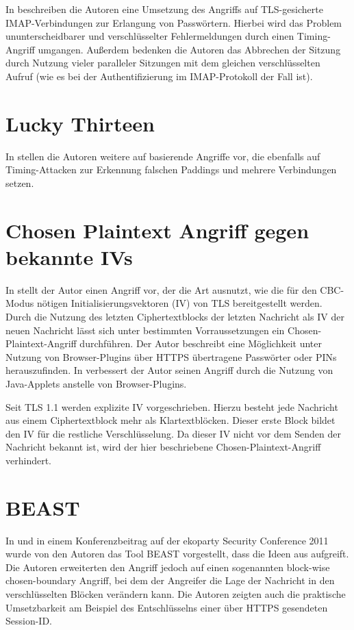 \documentclass[
    12pt,
    headings=small,
    parskip=half,           %
    bibliography=totoc,
    numbers=noenddot,       %
    open=any,               %
   final                   %
    ]{scrreprt}
\begin{document}
In \cite{canvel03} beschreiben die Autoren eine Umsetzung des Angriffs auf TLS-gesicherte IMAP-Verbindungen zur Erlangung von Passwörtern. Hierbei wird das Problem ununterscheidbarer und verschlüsselter Fehlermeldungen durch einen Timing-Angriff umgangen. Außerdem bedenken die Autoren das Abbrechen der Sitzung durch Nutzung vieler paralleler Sitzungen mit dem gleichen verschlüsselten Aufruf (wie es bei der Authentifizierung im IMAP-Protokoll der Fall ist).


\section{Lucky Thirteen}

In \cite{paterson13} stellen die Autoren weitere auf \cite{vaudenay02} basierende Angriffe vor, die ebenfalls auf Timing-Attacken zur Erkennung falschen Paddings und mehrere Verbindungen setzen.

\section{Chosen Plaintext Angriff gegen bekannte IVs}

In \cite{bard04} stellt der Autor einen Angriff vor, der die Art ausnutzt, wie die für den CBC-Modus nötigen Initialisierungsvektoren (IV) von TLS bereitgestellt werden. Durch die Nutzung des letzten Ciphertextblocks der letzten Nachricht als IV der neuen Nachricht lässt sich unter bestimmten Vorraussetzungen ein Chosen-Plaintext-Angriff durchführen. Der Autor beschreibt eine Möglichkeit unter Nutzung von Browser-Plugins über HTTPS übertragene Passwörter oder PINs herauszufinden. In \cite{bard06} verbessert der Autor seinen Angriff durch die Nutzung von Java-Applets anstelle von Browser-Plugins.

Seit TLS 1.1 werden explizite IV vorgeschrieben. Hierzu besteht jede Nachricht aus einem Ciphertextblock mehr als Klartextblöcken. Dieser erste Block bildet den IV für die restliche Verschlüsselung. Da dieser IV nicht vor dem Senden der Nachricht bekannt ist, wird der hier beschriebene Chosen-Plaintext-Angriff verhindert.

\section{BEAST}

In \cite{duong11} und in einem Konferenzbeitrag auf der ekoparty Security Conference 2011 wurde von den Autoren das Tool BEAST vorgestellt, dass die Ideen aus \cite{bard04} aufgreift. Die Autoren erweiterten den Angriff jedoch auf einen sogenannten block-wise chosen-boundary Angriff, bei dem der Angreifer die Lage der Nachricht in den verschlüsselten Blöcken verändern kann. Die Autoren zeigten auch die praktische Umsetzbarkeit am Beispiel des Entschlüsselns einer über HTTPS gesendeten Session-ID.
\end{document}
